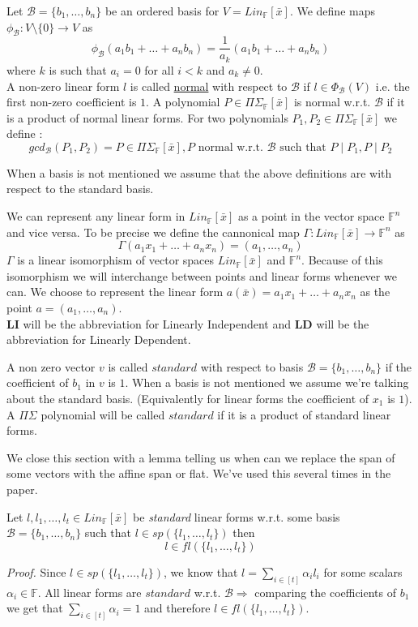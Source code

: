 \documentclass[letterpaper,USenglish,numberwithinsect]{lipics}
\newcommand{\F}{\mathbb{F}}
\newcommand{\MB}{\mathcal{B}}
\newcommand{\B}[1]{\bar{#1}}
\begin{document}
Let $\MB=\{b_1,\ldots,b_n\}$ be an ordered basis for $V = Lin_\F[\B{x}]$.
We define maps $\phi_\MB : V\setminus\{0\} \rightarrow V$ as
\[
\phi_{\MB}(a_1b_1+\ldots+a_nb_n) = \frac{1}{a_k}(a_1b_1+\ldots+a_nb_n)
 \]
 where $k$ is such that $a_i=0$ for all $i<k$ and $a_k\neq 0$.\\

A non-zero linear form $l$ is called \underline{normal} with respect to $\MB$
if $l\in \Phi_\MB(V)$ i.e. the first non-zero coefficient is $1$. A polynomial
$P\in \Pi\Sigma_\F[\B{x}]$ is normal w.r.t. $\MB$ if it is a product of
normal linear forms. For two polynomials $P_1,P_2\in \Pi\Sigma_\F[\B{x}]$ we
define :
\[
gcd_{\MB}(P_1,P_2) =  P\in \Pi\Sigma_\F[\B{x}], P \text{ normal w.r.t. } \MB
\text{ such that } P\mid P_1, P\mid P_2
\]

When a basis is not mentioned we assume that the above definitions are with respect
to the standard basis.

We can represent any linear form in $Lin_\F[\B{x}]$ as a point in the vector
space $\F^n$ and vice versa. To be precise
we define the cannonical map $\Gamma : Lin_{\F}[\B{x}] \rightarrow \F^n$ as
\[
\Gamma(a_1x_1+\ldots +a_nx_n) = (a_1,\ldots,a_n)
\]
$\Gamma$ is a linear isomorphism of vector spaces $Lin_\F[\B{x}]$ and $\F^n$.
Because of this isomorphism
we will interchange between points and linear forms whenever we can. We choose
to represent the linear form
$a(\B{x}) = a_1x_1+\ldots+a_nx_n$ as the point $a = (a_1,\ldots,a_n)$.\\

{\bf LI} will be the abbreviation for Linearly Independent and {\bf LD} will be
the abbreviation for Linearly Dependent.\\

\begin{definition}
A non zero vector $v$ is called $standard$ with respect to basis $\MB = \{b_1,\ldots,b_n\}$ if the coefficient of $b_1$ in
$v$ is $1$. When a basis is not mentioned we assume we're talking about the standard basis.
(Equivalently for linear forms the coefficient of $x_1$ is $1$). A $\Pi\Sigma$ polynomial
will be called $standard$ if it is a product of standard linear forms.
\end{definition}


We close this section with a lemma telling us when can
we replace the span of some vectors with the affine span or flat. We've used this several times in the paper.

\begin{lemma}\label{spantoflat}
 Let $l,l_1,\ldots,l_t \in Lin_\F[\B{x}]$ be \emph{standard} linear forms w.r.t. some basis $\MB =\{b_1,\ldots,b_n\}$ such that $l\in sp(\{l_1,\ldots,l_t\})$
 then
 \[
  l\in fl(\{l_1,\ldots,l_t\})
 \]

\end{lemma}
\emph{Proof.}
 Since $l\in sp(\{l_1,\ldots,l_t\})$, we know that $l=\sum\limits_{i\in [t]}\alpha_il_i$ for some scalars
 $\alpha_i\in \F$. All linear forms are $standard$ w.r.t. $\MB \Rightarrow$ comparing the coefficients of $b_1$ we get that
 $\sum\limits_{i\in [t]}\alpha_i=1$ and therefore $l\in fl(\{l_1,\ldots,l_t\})$.
\end{document}
